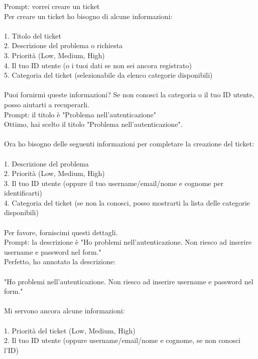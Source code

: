 \begin{windowsconsole}
Prompt: vorrei creare un ticket\\
Per creare un ticket ho bisogno di alcune informazioni:\\
\\
1. Titolo del ticket\\
2. Descrizione del problema o richiesta\\
3. Priorità (Low, Medium, High)\\
4. Il tuo ID utente (o i tuoi dati se non sei ancora registrato)\\
5. Categoria del ticket (selezionabile da elenco categorie disponibili)\\
\\
Puoi fornirmi queste informazioni? Se non conosci la categoria o il tuo ID utente, posso aiutarti a recuperarli.\\
Prompt: il titolo è "Problema nell'autenticazione"\\
Ottimo, hai scelto il titolo "Problema nell'autenticazione".\\
\\
Ora ho bisogno delle seguenti informazioni per completare la creazione del ticket:\\
\\
1. Descrizione del problema\\
2. Priorità (Low, Medium, High)\\
3. Il tuo ID utente (oppure il tuo username/email/nome e cognome per identificarti)\\
4. Categoria del ticket (se non la conosci, posso mostrarti la lista delle categorie disponibili)\\
\\
Per favore, forniscimi questi dettagli.\\
Prompt: la descrizione è "Ho problemi nell'autenticazione. Non riesco ad inserire username e password nel form."\\
Perfetto, ho annotato la descrizione:\\
\\
"Ho problemi nell'autenticazione. Non riesco ad inserire username e password nel form."\\
\\
Mi servono ancora alcune informazioni:\\
\\
1. Priorità del ticket (Low, Medium, High)\\
2. Il tuo ID utente (oppure username/email/nome e cognome, se non conosci l'ID)\\

\end{windowsconsole}
